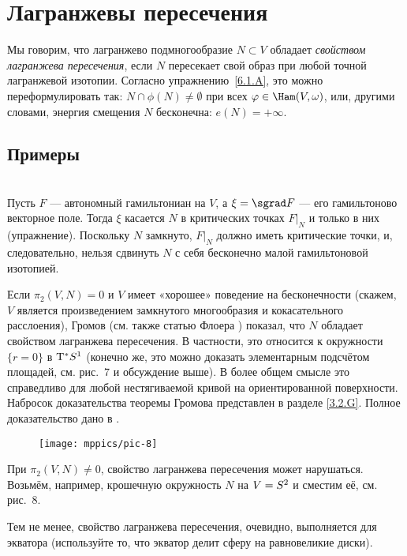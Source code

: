\section{Лагранжевы пересечения}

Мы говорим, что лагранжево подмногообразие $N \subset V$ обладает \emph{свойством лагранжева пересечения}, если $N$ пересекает свой образ при любой точной лагранжевой изотопии.
Согласно упражнению~\ref{6.1.A}, это можно переформулировать так: $N \cap \phi (N) \ne \emptyset$ при всех $\phi \in \Ham (V, \omega)$, или, другими словами, энергия смещения $N$ бесконечна: $e (N) = + \infty$.

\subsection*{Примеры} 

\begin{ex}{}\\
Пусть $F$ — автономный гамильтониан на $V$, а $\xi = \sgrad F$ — его гамильтоново
векторное поле. 
Тогда $\xi$ касается $N$ в критических точках $F|_N$ и только в них
(упражнение). 
Поскольку $N$ замкнуто, $F|_N$ должно иметь критические точки, и,
следовательно, нельзя сдвинуть $N$ с себя бесконечно малой
гамильтоновой изотопией. 
\end{ex}

\begin{ex}{}\label{6.2.B}
Если $\pi_2 (V, N) = 0$ и $V$ имеет «хорошее» поведение на
бесконечности (скажем, $V$ является произведением замкнутого
многообразия и кокасательного расслоения), Громов \cite{G1} (см. также
статью Флоера \cite{F}) показал, что $N$ обладает свойством лагранжева
пересечения. 
В частности, это относится к окружности $\{r = 0\}$ в $\mathrm{T}^\ast S^1$
(конечно же, это можно доказать элементарным подсчётом площадей,
см. рис.~7 и обсуждение выше). 
В более общем смысле это справедливо для любой нестягиваемой кривой на
ориентированной поверхности. 
Набросок доказательства теоремы Громова представлен в разделе \ref{3.2.G}.
Полное доказательство дано в \cite[Chap. X]{AL}. 

\begin{wrapfigure}{o}{25 mm}
\vskip-3mm
\centering
\texttt{[image: mppics/pic-8]}
\caption{}\label{pic-8}
\vskip0mm
\end{wrapfigure}

При $\pi_2 (V, N) \ne 0$, свойство лагранжева пересечения может нарушаться.
Возьмём, например, крошечную окружность $N$ на $V \z= S^2$ и сместим её, см. рис.~8.

Тем не менее, свойство лагранжева пересечения, очевидно, выполняется для экватора (используйте то, что экватор делит сферу на равновеликие диски).
\end{ex}

